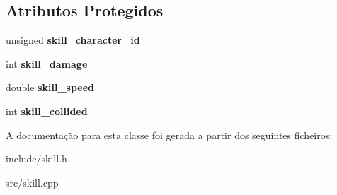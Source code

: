 \subsection*{Atributos Protegidos}
\begin{DoxyCompactItemize}
\item 
\mbox{\label{classSkill_a6b836b689172c632c34ebf2010c7f94e}} 
unsigned {\bfseries skill\+\_\+character\+\_\+id}
\item 
\mbox{\label{classSkill_a68fa3060a454b635aada6662d9fb2322}} 
int {\bfseries skill\+\_\+damage}
\item 
\mbox{\label{classSkill_a5616db66c8db4011c77a9850ade84940}} 
double {\bfseries skill\+\_\+speed}
\item 
\mbox{\label{classSkill_acde70fa4d6b0b5f31310de514f3a9f4e}} 
int {\bfseries skill\+\_\+collided}
\end{DoxyCompactItemize}


A documentação para esta classe foi gerada a partir dos seguintes ficheiros\+:\begin{DoxyCompactItemize}
\item 
include/skill.\+h\item 
src/skill.\+cpp\end{DoxyCompactItemize}
